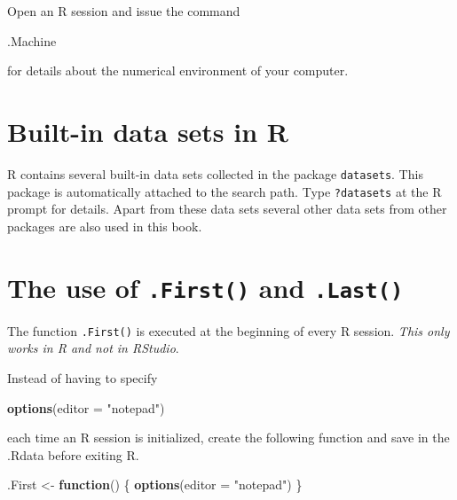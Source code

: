 \documentclass[
]{book}
\newenvironment{Shaded}{\begin{snugshade}}{\end{snugshade}}
\newcommand{\AttributeTok}[1]{\textcolor[rgb]{0.13,0.29,0.53}{#1}}
\newcommand{\ControlFlowTok}[1]{\textcolor[rgb]{0.13,0.29,0.53}{\textbf{#1}}}
\newcommand{\FunctionTok}[1]{\textcolor[rgb]{0.13,0.29,0.53}{\textbf{#1}}}
\newcommand{\NormalTok}[1]{#1}
\newcommand{\OtherTok}[1]{\textcolor[rgb]{0.56,0.35,0.01}{#1}}
\newcommand{\StringTok}[1]{\textcolor[rgb]{0.31,0.60,0.02}{#1}}
\begin{document}
Open an R session and issue the command

\begin{Shaded}
\begin{Highlighting}[]
\NormalTok{.Machine}
\end{Highlighting}
\end{Shaded}

for details about the numerical environment of your computer.

\section{Built-in data sets in R}\label{built-in-data-sets-in-r}

R contains several built-in data sets collected in the package \texttt{datasets}. This package is automatically attached to the search path. Type \texttt{?datasets} at the R prompt for details. Apart from these data sets several other data sets from other packages are also used in this book.

\section{\texorpdfstring{The use of \texttt{.First()} and \texttt{.Last()}}{The use of .First() and .Last()}}\label{the-use-of-.first-and-.last}

The function \texttt{.First()} is executed at the beginning of every R session. \emph{{This only works in R and not in RStudio}}.

Instead of having to specify

\begin{Shaded}
\begin{Highlighting}[]
\FunctionTok{options}\NormalTok{(}\AttributeTok{editor =} \StringTok{"notepad"}\NormalTok{)}
\end{Highlighting}
\end{Shaded}

each time an R session is initialized, create the following function and save in the {.Rdata} before exiting R.

\begin{Shaded}
\begin{Highlighting}[]
\NormalTok{.First }\OtherTok{\textless{}{-}} \ControlFlowTok{function}\NormalTok{() \{ }\FunctionTok{options}\NormalTok{(}\AttributeTok{editor =} \StringTok{"notepad"}\NormalTok{) \}}
\end{Highlighting}
\end{Shaded}
\end{document}

